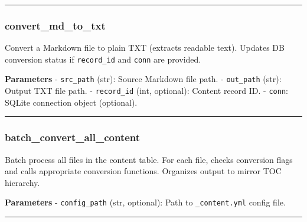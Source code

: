 \begin{center}\rule{0.5\linewidth}{0.5pt}\end{center}

\subsubsection{convert\_md\_to\_txt}\label{convert_md_to_txt}

\begin{Shaded}
\begin{Highlighting}[]
\OperatorTok{=}\OperatorTok{=}\NormalTok{)}
\end{Highlighting}
\end{Shaded}

Convert a Markdown file to plain TXT (extracts readable text). Updates
DB conversion status if \texttt{record\_id} and \texttt{conn} are
provided.

\textbf{Parameters} - \texttt{src\_path} (str): Source Markdown file
path. - \texttt{out\_path} (str): Output TXT file path. -
\texttt{record\_id} (int, optional): Content record ID. - \texttt{conn}:
SQLite connection object (optional).

\begin{center}\rule{0.5\linewidth}{0.5pt}\end{center}

\subsubsection{batch\_convert\_all\_content}\label{batch_convert_all_content}

\begin{Shaded}
\begin{Highlighting}[]
\OperatorTok{=}\NormalTok{)}
\end{Highlighting}
\end{Shaded}

Batch process all files in the content table. For each file, checks
conversion flags and calls appropriate conversion functions. Organizes
output to mirror TOC hierarchy.

\textbf{Parameters} - \texttt{config\_path} (str, optional): Path to
\texttt{\_content.yml} config file.

\begin{center}\rule{0.5\linewidth}{0.5pt}\end{center}

